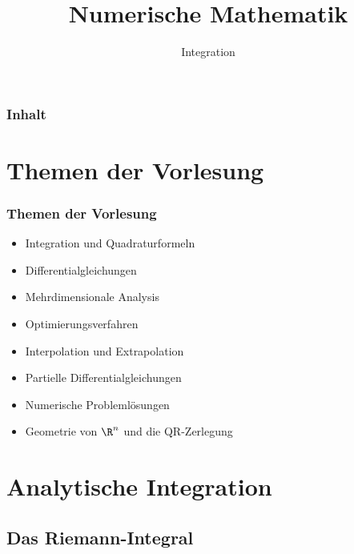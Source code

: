 

\title{Numerische Mathematik}
\subtitle{Integration}



\makeTitlePage

\begin{frame}\frametitle{Inhalt}
 \setcounter{tocdepth}{2}
   \tableofcontents
\end{frame}
%

%
\section{Themen der Vorlesung}
\begin{frame}\frametitle{Themen der Vorlesung}
\begin{itemize}
\item Integration und Quadraturformeln
\item Differentialgleichungen
\item Mehrdimensionale Analysis
\item Optimierungsverfahren
\item Interpolation und Extrapolation
\item Partielle Differentialgleichungen
\item Numerische Problemlösungen
\item Geometrie von $\R^n$ und die QR-Zerlegung
\end{itemize}
\end{frame}
%
\section{Analytische Integration}
\makeSectionDividerPage
%
\subsection{Das Riemann-Integral}
